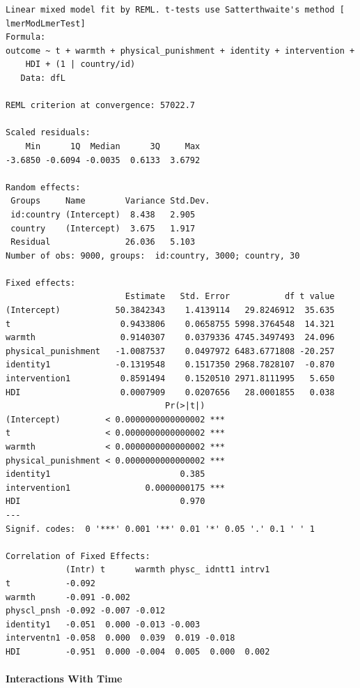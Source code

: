 \documentclass[
  letterpaper,
  DIV=11,
  numbers=noendperiod]{scrreprt}
\let\oldparagraph\paragraph
\renewcommand{\paragraph}[1]{\oldparagraph{#1}\mbox{}}
\begin{document}
\begin{verbatim}
Linear mixed model fit by REML. t-tests use Satterthwaite's method [
lmerModLmerTest]
Formula: 
outcome ~ t + warmth + physical_punishment + identity + intervention +  
    HDI + (1 | country/id)
   Data: dfL

REML criterion at convergence: 57022.7

Scaled residuals: 
    Min      1Q  Median      3Q     Max 
-3.6850 -0.6094 -0.0035  0.6133  3.6792 

Random effects:
 Groups     Name        Variance Std.Dev.
 id:country (Intercept)  8.438   2.905   
 country    (Intercept)  3.675   1.917   
 Residual               26.036   5.103   
Number of obs: 9000, groups:  id:country, 3000; country, 30

Fixed effects:
                        Estimate   Std. Error           df t value
(Intercept)           50.3842343    1.4139114   29.8246912  35.635
t                      0.9433806    0.0658755 5998.3764548  14.321
warmth                 0.9140307    0.0379336 4745.3497493  24.096
physical_punishment   -1.0087537    0.0497972 6483.6771808 -20.257
identity1             -0.1319548    0.1517350 2968.7828107  -0.870
intervention1          0.8591494    0.1520510 2971.8111995   5.650
HDI                    0.0007909    0.0207656   28.0001855   0.038
                                Pr(>|t|)    
(Intercept)         < 0.0000000000000002 ***
t                   < 0.0000000000000002 ***
warmth              < 0.0000000000000002 ***
physical_punishment < 0.0000000000000002 ***
identity1                          0.385    
intervention1               0.0000000175 ***
HDI                                0.970    
---
Signif. codes:  0 '***' 0.001 '**' 0.01 '*' 0.05 '.' 0.1 ' ' 1

Correlation of Fixed Effects:
            (Intr) t      warmth physc_ idntt1 intrv1
t           -0.092                                   
warmth      -0.091 -0.002                            
physcl_pnsh -0.092 -0.007 -0.012                     
identity1   -0.051  0.000 -0.013 -0.003              
interventn1 -0.058  0.000  0.039  0.019 -0.018       
HDI         -0.951  0.000 -0.004  0.005  0.000  0.002
\end{verbatim}

\paragraph{Interactions With Time}\label{interactions-with-time-1}
\end{document}

